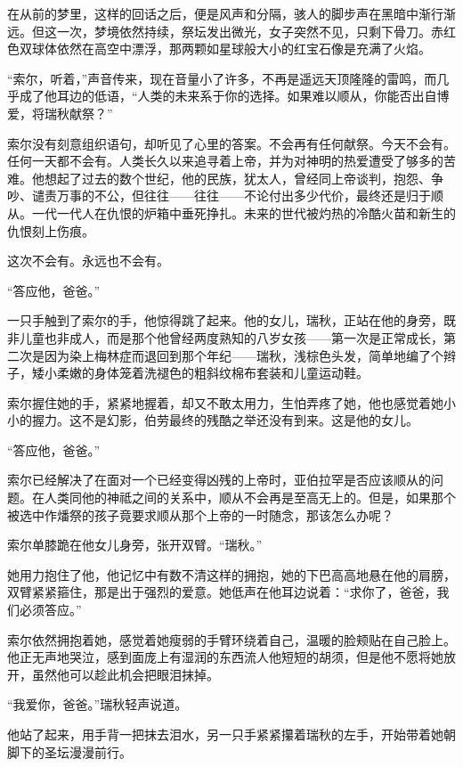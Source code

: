 \documentclass[AutoFakeBold=true]{book}
\begin{document}
在从前的梦里，这样的回话之后，便是风声和分隔，骇人的脚步声在黑暗中渐行渐远。但这一次，梦境依然持续，祭坛发出微光，女子突然不见，只剩下骨刀。赤红色双球体依然在高空中漂浮，那两颗如星球般大小的红宝石像是充满了火焰。

{\kaishu ``索尔，听着，''}声音传来，现在音量小了许多，不再是遥远天顶隆隆的雷鸣，而几乎成了他耳边的低语，{\kaishu ``人类的未来系于你的选择。如果难以顺从，你能否出自博爱，将瑞秋献祭？''}

索尔没有刻意组织语句，却听见了心里的答案。不会再有任何献祭。今天不会有。任何一天都不会有。人类长久以来追寻着上帝，并为对神明的热爱遭受了够多的苦难。他想起了过去的数个世纪，他的民族，犹太人，曾经同上帝谈判，抱怨、争吵、谴责万事的不公，但往往——往往——不论付出多少代价，最终还是归于顺从。一代一代人在仇恨的炉箱中垂死挣扎。未来的世代被灼热的冷酷火苗和新生的仇恨刻上伤痕。

这次不会有。永远也不会有。

``答应他，爸爸。''

一只手触到了索尔的手，他惊得跳了起来。他的女儿，瑞秋，正站在他的身旁，既非儿童也非成人，而是那个他曾经两度熟知的八岁女孩——第一次是正常成长，第二次是因为染上梅林症而退回到那个年纪——瑞秋，浅棕色头发，简单地编了个辫子，矮小柔嫩的身体笼着洗褪色的粗斜纹棉布套装和儿童运动鞋。

索尔握住她的手，紧紧地握着，却又不敢太用力，生怕弄疼了她，他也感觉着她小小的握力。这不是幻影，伯劳最终的残酷之举还没有到来。这是他的女儿。

``答应他，爸爸。''

索尔已经解决了在面对一个已经变得凶残的上帝时，亚伯拉罕是否应该顺从的问题。在人类同他的神祗之间的关系中，顺从不会再是至高无上的。但是，如果那个被选中作燔祭的{\kaishu 孩子}竟要求顺从那个上帝的一时随念，那该怎么办呢？

索尔单膝跪在他女儿身旁，张开双臂。``瑞秋。''

她用力抱住了他，他记忆中有数不清这样的拥抱，她的下巴高高地悬在他的肩膀，双臂紧紧箍住，那是出于强烈的爱意。她低声在他耳边说着：``求你了，爸爸，我们必须答应。''

索尔依然拥抱着她，感觉着她瘦弱的手臂环绕着自己，温暖的脸颊贴在自己脸上。他正无声地哭泣，感到面庞上有湿润的东西流人他短短的胡须，但是他不愿将她放开，虽然他可以趁此机会把眼泪抹掉。

``我爱你，爸爸。''瑞秋轻声说道。

他站了起来，用手背一把抹去泪水，另一只手紧紧攥着瑞秋的左手，开始带着她朝脚下的圣坛漫漫前行。

\vspace*{1em}
\end{document}
